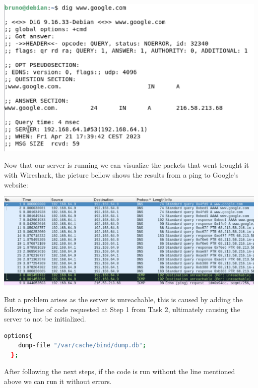 \documentclass{article}
\begin{document}
\begin{center}
  \includegraphics[scale=0.5]{images/dig-google.png}
\end{center}

Now that our server is running we can visualize the packets that went trought it with Wireshark, the picture bellow shows the results from a ping to Google's website:

\begin{center}
  \includegraphics[scale=0.4]{images/ping-google.png}
\end{center}

But a problem arises as the server is unreachable, this is caused by adding the following line of code requested at Step 1 from Task 2, ultimately causing the server to not be initialized.

\hbox{}

\begin{lstlisting}[language=bash, frame=tlbr, framesep=6pt, backgroundcolor=\color{light-gray}]
  options{
    dump-file "/var/cache/bind/dump.db";
  };
\end{lstlisting}

After following the next steps, if the code is run without the line mentioned above we can run it without errors.
\end{document}
